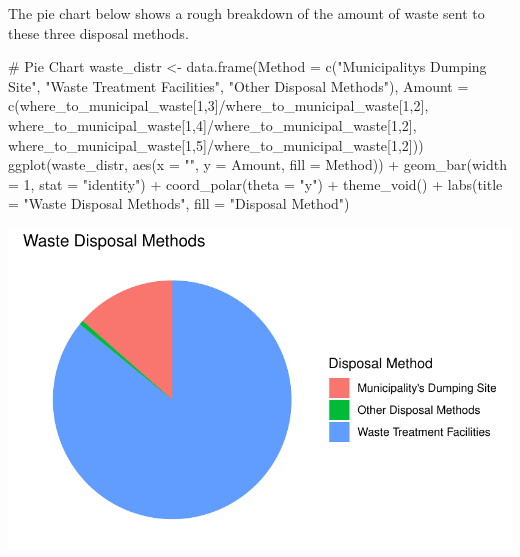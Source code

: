 \documentclass[
  11pt,
  a4paper,
  DIV=11,
  numbers=noendperiod]{scrartcl}
\newenvironment{Shaded}{\begin{snugshade}}{\end{snugshade}}
\newcommand{\AttributeTok}[1]{\textcolor[rgb]{0.40,0.45,0.13}{#1}}
\newcommand{\CommentTok}[1]{\textcolor[rgb]{0.37,0.37,0.37}{#1}}
\newcommand{\DecValTok}[1]{\textcolor[rgb]{0.68,0.00,0.00}{#1}}
\newcommand{\FunctionTok}[1]{\textcolor[rgb]{0.28,0.35,0.67}{#1}}
\newcommand{\NormalTok}[1]{\textcolor[rgb]{0.00,0.23,0.31}{#1}}
\newcommand{\OtherTok}[1]{\textcolor[rgb]{0.00,0.23,0.31}{#1}}
\newcommand{\SpecialCharTok}[1]{\textcolor[rgb]{0.37,0.37,0.37}{#1}}
\newcommand{\StringTok}[1]{\textcolor[rgb]{0.13,0.47,0.30}{#1}}
\begin{document}
The pie chart below shows a rough breakdown of the amount of waste sent
to these three disposal methods.

\begin{Shaded}
\begin{Highlighting}[]
\CommentTok{\# Pie Chart}
\NormalTok{waste\_distr }\OtherTok{\textless{}{-}} \FunctionTok{data.frame}\NormalTok{(}\AttributeTok{Method =} \FunctionTok{c}\NormalTok{(}\StringTok{"Municipality\textquotesingle{}s Dumping Site"}\NormalTok{, }\StringTok{"Waste Treatment Facilities"}\NormalTok{, }\StringTok{"Other Disposal Methods"}\NormalTok{), }\AttributeTok{Amount =} \FunctionTok{c}\NormalTok{(where\_to\_municipal\_waste[}\DecValTok{1}\NormalTok{,}\DecValTok{3}\NormalTok{]}\SpecialCharTok{/}\NormalTok{where\_to\_municipal\_waste[}\DecValTok{1}\NormalTok{,}\DecValTok{2}\NormalTok{], where\_to\_municipal\_waste[}\DecValTok{1}\NormalTok{,}\DecValTok{4}\NormalTok{]}\SpecialCharTok{/}\NormalTok{where\_to\_municipal\_waste[}\DecValTok{1}\NormalTok{,}\DecValTok{2}\NormalTok{], where\_to\_municipal\_waste[}\DecValTok{1}\NormalTok{,}\DecValTok{5}\NormalTok{]}\SpecialCharTok{/}\NormalTok{where\_to\_municipal\_waste[}\DecValTok{1}\NormalTok{,}\DecValTok{2}\NormalTok{]))}
\FunctionTok{ggplot}\NormalTok{(waste\_distr, }\FunctionTok{aes}\NormalTok{(}\AttributeTok{x =} \StringTok{""}\NormalTok{, }\AttributeTok{y =}\NormalTok{ Amount, }\AttributeTok{fill =}\NormalTok{ Method)) }\SpecialCharTok{+} 
  \FunctionTok{geom\_bar}\NormalTok{(}\AttributeTok{width =} \DecValTok{1}\NormalTok{, }\AttributeTok{stat =} \StringTok{"identity"}\NormalTok{) }\SpecialCharTok{+} 
  \FunctionTok{coord\_polar}\NormalTok{(}\AttributeTok{theta =} \StringTok{"y"}\NormalTok{) }\SpecialCharTok{+} 
  \FunctionTok{theme\_void}\NormalTok{() }\SpecialCharTok{+}
  \FunctionTok{labs}\NormalTok{(}\AttributeTok{title =} \StringTok{"Waste Disposal Methods"}\NormalTok{, }\AttributeTok{fill =} \StringTok{"Disposal Method"}\NormalTok{)}
\end{Highlighting}
\end{Shaded}

\includegraphics{project_files/figure-pdf/unnamed-chunk-20-1.pdf}
\end{document}
